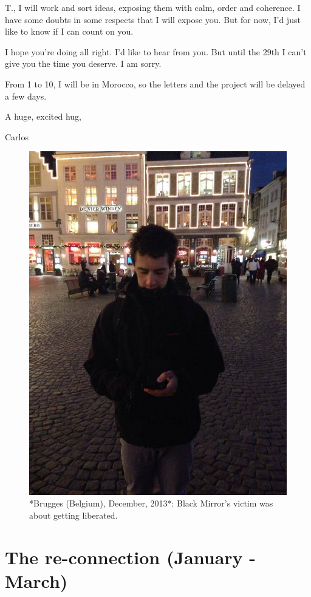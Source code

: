 \documentclass[]{book}
\begin{document}
T., I will work and sort ideas, exposing them with calm, order and coherence. I have some doubts in some respects that I will expose you. But for now, I'd just like to know if I can count on you.

I hope you're doing all right. I'd like to hear from you. But until the 29th I can't give you the time you deserve. I am sorry.

From 1 to 10, I will be in Morocco, so the letters and the project will be delayed a few days.

A huge, excited hug,

Carlos

\begin{figure}

{\centering \includegraphics[width=0.75\linewidth]{images/2014/smartphone} 

}

\caption{*Brugges (Belgium), December, 2013*: Black Mirror's victim was about getting liberated.}\label{fig:smartphone}
\end{figure}

\hypertarget{reconnect}{%
\chapter*{The re-connection (January - March)}\label{reconnect}}
\end{document}
